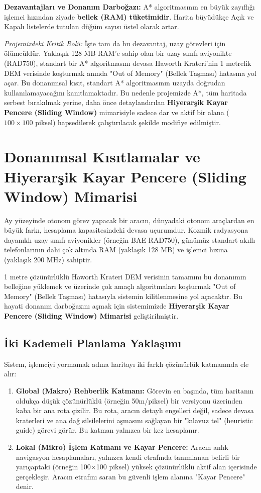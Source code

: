 \documentclass[12pt,a4paper]{article}
\begin{document}
\textbf{Dezavantajları ve Donanım Darboğazı:} A* algoritmasının en büyük zayıflığı işlemci hızından ziyade \textbf{bellek (RAM) tüketimidir}. Harita büyüdükçe Açık ve Kapalı listelerde tutulan düğüm sayısı üstel olarak artar. 

\textit{Projemizdeki Kritik Rolü:} İşte tam da bu dezavantaj, uzay görevleri için ölümcüldür. Yaklaşık 128 MB RAM'e sahip olan bir uzay sınıfı aviyonikte (RAD750), standart bir A* algoritmasını devasa Haworth Krateri'nin 1 metrelik DEM verisinde koşturmak anında "Out of Memory" (Bellek Taşması) hatasına yol açar. Bu donanımsal kısıt, standart A* algoritmasının uzayda doğrudan kullanılamayacağını kanıtlamaktadır. Bu nedenle projemizde A*, tüm haritada serbest bırakılmak yerine, daha önce detaylandırılan \textbf{Hiyerarşik Kayar Pencere (Sliding Window)} mimarisiyle sadece dar ve aktif bir alana ($100 \times 100$ piksel) hapsedilerek çalıştırılacak şekilde modifiye edilmiştir.
\section{Donanımsal Kısıtlamalar ve Hiyerarşik Kayar Pencere (Sliding Window) Mimarisi}
Ay yüzeyinde otonom görev yapacak bir aracın, dünyadaki otonom araçlardan en büyük farkı, hesaplama kapasitesindeki devasa uçurumdur. Kozmik radyasyona dayanıklı uzay sınıfı aviyonikler (örneğin BAE RAD750), günümüz standart akıllı telefonlarının dahi çok altında RAM (yaklaşık 128 MB) ve işlemci hızına (yaklaşık 200 MHz) sahiptir.

1 metre çözünürlüklü Haworth Krateri DEM verisinin tamamını bu donanımın belleğine yüklemek ve üzerinde çok amaçlı algoritmaları koşturmak "Out of Memory" (Bellek Taşması) hatasıyla sistemin kilitlenmesine yol açacaktır. Bu hayati donanım darboğazını aşmak için sistemimizde \textbf{Hiyerarşik Kayar Pencere (Sliding Window) Mimarisi} geliştirilmiştir.

\subsection{İki Kademeli Planlama Yaklaşımı}
Sistem, işlemciyi yormamak adına haritayı iki farklı çözünürlük katmanında ele alır:
\begin{enumerate}
    \item \textbf{Global (Makro) Rehberlik Katmanı:} Görevin en başında, tüm haritanın oldukça düşük çözünürlüklü (örneğin 50m/piksel) bir versiyonu üzerinden kaba bir ana rota çizilir. Bu rota, aracın detaylı engelleri değil, sadece devasa kraterleri ve ana dağ silsilelerini aşmasını sağlayan bir "kılavuz tel" (heuristic guide) görevi görür. Bu katman yalnızca bir kez hesaplanır.
    \item \textbf{Lokal (Mikro) İşlem Katmanı ve Kayar Pencere:} Aracın anlık navigasyon hesaplamaları, yalnızca kendi etrafında tanımlanan belirli bir yarıçaptaki (örneğin 100$\times$100 piksel) yüksek çözünürlüklü aktif alan içerisinde gerçekleşir. Aracın etrafını saran bu güvenli işlem alanına "Kayar Pencere" denir.
\end{enumerate}
\end{document}
